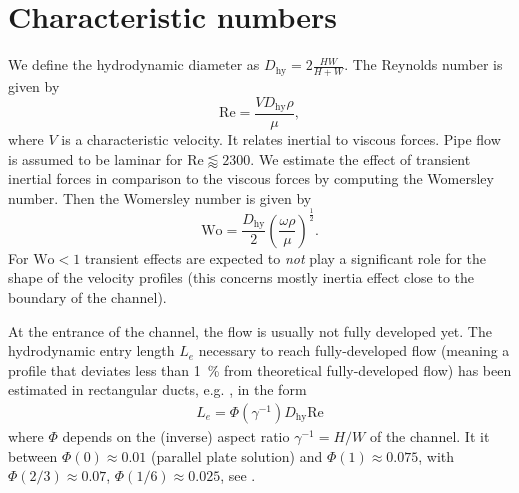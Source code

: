 \documentclass{article}
\begin{document}
\section{Characteristic numbers}
We define the hydrodynamic diameter as $D_\text{hy} = 2\frac{HW}{H+W}$. The Reynolds number is given by
\begin{equation}
    \text{Re} = \frac{V D_\text{hy} \rho}{\mu},
\end{equation}
where $V$ is a characteristic velocity. It relates inertial to viscous forces. Pipe flow is assumed to be laminar for $\text{Re} \lessapprox 2300$.
We estimate the effect of transient inertial forces in comparison to the viscous forces by computing the Womersley number. Then the Womersley number is given by
\begin{equation}
    \text{Wo} = \frac{D_\text{hy}}{2} \left( \frac{\omega\rho}{\mu} \right)^\frac{1}{2}.
\end{equation}
For $\text{Wo} < 1$ transient effects are expected to \emph{not} play a significant role for the shape of the velocity profiles (this concerns mostly inertia effect close to the boundary of the channel).

At the entrance of the channel, the flow is usually not fully developed yet. The hydrodynamic entry length $L_e$ necessary to reach fully-developed flow (meaning a profile that deviates less than \SI{1}{\percent} from theoretical fully-developed flow) has been estimated in rectangular ducts, e.g. \cite{Han1960}, in the form
\begin{align}
  L_e = \Phi(\gamma^{-1}) D_\text{hy} \text{Re}
\end{align}
where $\Phi$ depends on the (inverse) aspect ratio $\gamma^{-1} = H/W$ of the channel. It it between $\Phi(0) \approx 0.01$ (parallel plate solution) and $\Phi(1) \approx 0.075$, with $\Phi(2/3) \approx 0.07$, $\Phi(1/6) \approx 0.025$, see \cite[Table 2]{Han1960}.
\end{document}
